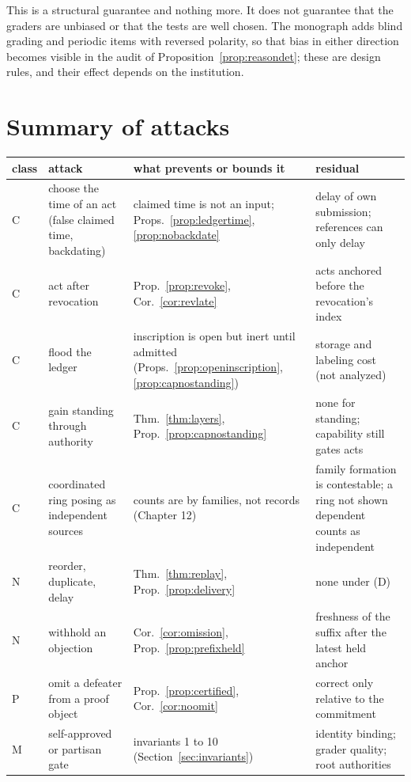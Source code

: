 \documentclass[11pt]{article}
\theoremstyle{plain}
\theoremstyle{definition}
\theoremstyle{remark}
\begin{document}
This is a structural guarantee and nothing more. It does not guarantee that the graders are unbiased or that the tests are well chosen. The monograph adds blind grading and periodic items with reversed polarity, so that bias in either direction becomes visible in the audit of Proposition~\ref{prop:reasondet}; these are design rules, and their effect depends on the institution.

\section{Summary of attacks}\label{sec:attacks}

{\small
\begin{longtable}{@{}l >{\raggedright\arraybackslash}p{} >{\raggedright\arraybackslash}p{} >{\raggedright\arraybackslash}p{}@{}}
\toprule
class & attack & what prevents or bounds it & residual\\
\midrule
\endhead
C & choose the time of an act (false claimed time, backdating) & claimed time is not an input; Props.~\ref{prop:ledgertime}, \ref{prop:nobackdate} & delay of own submission; references can only delay\\
C & act after revocation & Prop.~\ref{prop:revoke}, Cor.~\ref{cor:revlate} & acts anchored before the revocation's index\\
C & flood the ledger & inscription is open but inert until admitted (Props.~\ref{prop:openinscription}, \ref{prop:capnostanding}) & storage and labeling cost (not analyzed)\\
C & gain standing through authority & Thm.~\ref{thm:layers}, Prop.~\ref{prop:capnostanding} & none for standing; capability still gates acts\\
C & coordinated ring posing as independent sources & counts are by families, not records (Chapter 12) & family formation is contestable; a ring not shown dependent counts as independent\\
N & reorder, duplicate, delay & Thm.~\ref{thm:replay}, Prop.~\ref{prop:delivery} & none under (D)\\
N & withhold an objection & Cor.~\ref{cor:omission}, Prop.~\ref{prop:prefixheld} & freshness of the suffix after the latest held anchor\\
P & omit a defeater from a proof object & Prop.~\ref{prop:certified}, Cor.~\ref{cor:noomit} & correct only relative to the commitment\\
M & self-approved or partisan gate & invariants 1 to 10 (Section~\ref{sec:invariants}) & identity binding; grader quality; root authorities\\

\end{longtable}}
\end{document}
